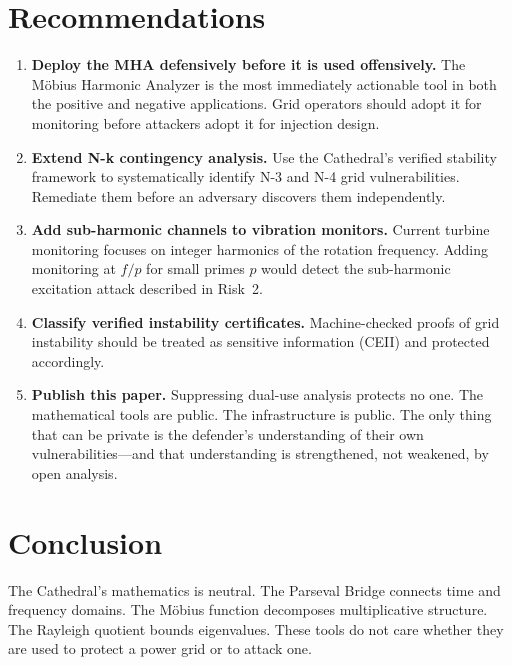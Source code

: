 \documentclass[11pt,a4paper]{article}
\begin{document}
\section{Recommendations}

\begin{enumerate}
  \item \textbf{Deploy the MHA defensively before it is used
    offensively.} The M\"obius Harmonic Analyzer is the most
    immediately actionable tool in both the positive and negative
    applications. Grid operators should adopt it for monitoring
    before attackers adopt it for injection design.

  \item \textbf{Extend N-k contingency analysis.} Use the Cathedral's
    verified stability framework to systematically identify N-3 and
    N-4 grid vulnerabilities. Remediate them before an adversary
    discovers them independently.

  \item \textbf{Add sub-harmonic channels to vibration monitors.}
    Current turbine monitoring focuses on integer harmonics of the
    rotation frequency. Adding monitoring at $f/p$ for small primes
    $p$ would detect the sub-harmonic excitation attack described
    in Risk~2.

  \item \textbf{Classify verified instability certificates.}
    Machine-checked proofs of grid instability should be treated
    as sensitive information (CEII) and protected accordingly.

  \item \textbf{Publish this paper.} Suppressing dual-use analysis
    protects no one. The mathematical tools are public. The
    infrastructure is public. The only thing that can be private is
    the defender's understanding of their own vulnerabilities---and
    that understanding is strengthened, not weakened, by open
    analysis.
\end{enumerate}

\section{Conclusion}

The Cathedral's mathematics is neutral. The Parseval Bridge connects
time and frequency domains. The M\"obius function decomposes
multiplicative structure. The Rayleigh quotient bounds eigenvalues.
These tools do not care whether they are used to protect a power
grid or to attack one.
\end{document}
